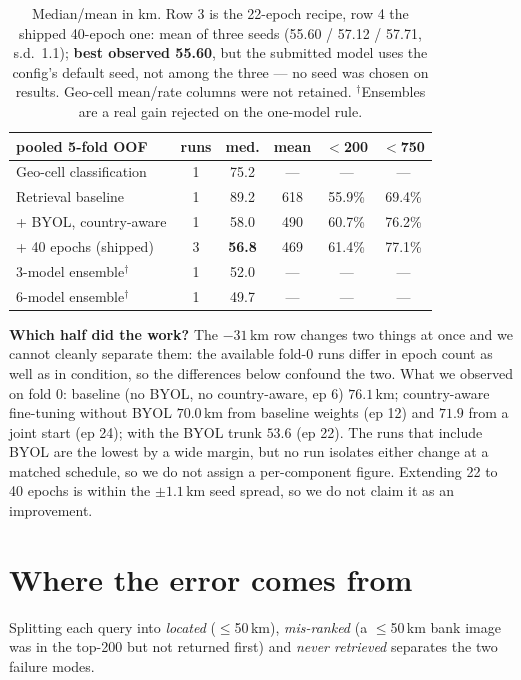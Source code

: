 \documentclass[10pt,a4paper,twocolumn]{article}
\begin{document}
\begin{table}[h]
\centering\footnotesize
\setlength{\tabcolsep}{3.5pt}
\begin{tabular}{@{}l@{\hspace{5pt}}ccccc@{}}
\toprule
pooled 5-fold OOF & runs & med. & mean & $<$200 & $<$750 \\
\midrule
Geo-cell classification    & 1 & 75.2 & --- & --- & --- \\
Retrieval baseline         & 1 & 89.2 & 618 & 55.9\% & 69.4\% \\
\;+ BYOL, country-aware    & 1 & 58.0 & 490 & 60.7\% & 76.2\% \\
\;+ 40 epochs (shipped)    & 3 & \textbf{56.8} & 469 & 61.4\% & 77.1\% \\
\midrule
3-model ensemble$^{\dagger}$ & 1 & 52.0 & --- & --- & --- \\
6-model ensemble$^{\dagger}$ & 1 & 49.7 & --- & --- & --- \\
\bottomrule
\end{tabular}
\caption{Median/mean in km. Row 3 is the 22-epoch recipe, row 4 the shipped
40-epoch one: mean of three seeds (55.60 / 57.12 / 57.71, s.d.\ 1.1);
\textbf{best observed 55.60}, but the submitted model uses the config's default
seed, not among the three --- no seed was chosen on results. Geo-cell
mean/rate columns were not retained. $^{\dagger}$Ensembles are a real gain
rejected on the one-model rule.}
\label{tab:main}
\end{table}

\textbf{Which half did the work?} The $-31$\,km row changes two things at once
and we cannot cleanly separate them: the available fold-0 runs differ in epoch
count as well as in condition, so the differences below confound the two. What
we observed on fold 0: baseline (no BYOL, no country-aware, ep 6) $76.1$\,km;
country-aware fine-tuning without BYOL $70.0$\,km from baseline weights (ep 12)
and $71.9$ from a joint start (ep 24); with the BYOL trunk $\mathbf{53.6}$
(ep 22). The runs that include BYOL are the lowest by a wide margin, but no
run isolates either change at a matched schedule, so we do not assign a
per-component figure. Extending 22 to 40 epochs is within the $\pm1.1$\,km seed
spread, so we do not claim it as an improvement.

\section{Where the error comes from}

Splitting each query into \emph{located} ($\le$50\,km), \emph{mis-ranked} (a
$\le$50\,km bank image was in the top-200 but not returned first) and
\emph{never retrieved} separates the two failure modes.
\end{document}

